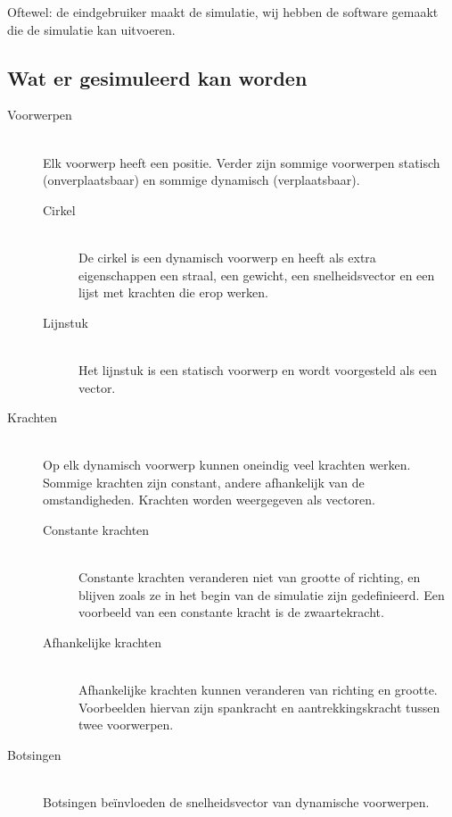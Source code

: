 \documentclass[12pt,a4paper]{article}
\begin{document}
	Oftewel: de eindgebruiker maakt de simulatie, wij hebben de software gemaakt die de simulatie kan uitvoeren.
	
	\subsection{Wat er gesimuleerd kan worden}
	\begin{description}
  		\item[Voorwerpen] \hfill \\
  			Elk voorwerp heeft een positie. Verder zijn sommige voorwerpen statisch (onverplaatsbaar) en sommige dynamisch (verplaatsbaar).
			\begin{description}
				\item[Cirkel] \hfill \\
					De cirkel is een dynamisch voorwerp en heeft als extra eigenschappen een straal, een gewicht, een snelheidsvector en een lijst met krachten die erop werken.
				
				\item[Lijnstuk] \hfill \\
					Het lijnstuk is een statisch voorwerp en wordt voorgesteld als een vector.
			\end{description}
		\item[Krachten] \hfill \\
			Op elk dynamisch voorwerp kunnen oneindig veel krachten werken. Sommige krachten zijn constant, andere afhankelijk van de omstandigheden. Krachten worden weergegeven als vectoren.
			\begin{description}
				\item[Constante krachten] \hfill \\
					Constante krachten veranderen niet van grootte of richting, en blijven zoals ze in het begin van de simulatie zijn gedefinieerd. Een voorbeeld van een constante kracht is de zwaartekracht.
				\item[Afhankelijke krachten] \hfill \\
					Afhankelijke krachten kunnen veranderen van richting en grootte. Voorbeelden hiervan zijn spankracht en aantrekkingskracht tussen twee voorwerpen.
			\end{description}
		\item[Botsingen] \hfill \\
			Botsingen be\"{i}nvloeden de snelheidsvector van dynamische voorwerpen.
	\end{description}
	
\end{document}
